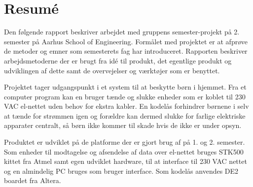 \chapter*{Resumé}

Den følgende rapport beskriver arbejdet med gruppens semester-projekt på 2. semester på Aarhus School of Engineering. Formålet med projektet er at afprøve de metoder og emner som semesterets fag har introduceret. Rapporten beskriver arbejdsmetoderne der er brugt fra idé til produkt, det egentlige produkt og udviklingen af dette samt de overvejelser og værktøjer som er benyttet.

Projektet tager udgangspunkt i et system til at beskytte børn i hjemmet. Fra et computer program kan en bruger tænde og slukke enheder som er koblet til 230 VAC el-nettet uden behov for ekstra kabler. En kodelås forhindrer børnene i selv at tænde for strømmen igen og forældre kan dermed slukke for farlige elektriske apparater centralt, så børn ikke kommer til skade hvis de ikke er under opsyn. 

Produktet er udviklet på de platforme der er gjort brug af på 1. og 2. semester. Som enheder til modtagelse og afsendelse af data over el-nettet bruges STK500 kittet fra Atmel samt egen udviklet hardware, til at interface til 230 VAC nettet og en almindelig PC bruges som bruger interface. Som kodelås anvendes DE2 boardet fra Altera.

